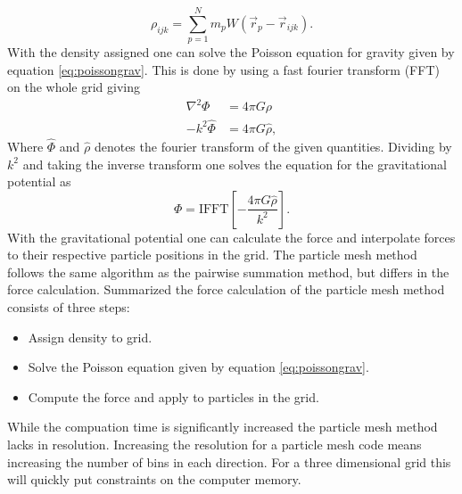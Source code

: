 \begin{equation}
    \rho_{ijk}=\sum_{p=1}^Nm_pW(\vec{r}_p-\vec{r}_{ijk}).
\end{equation}
With the density assigned one can solve the Poisson equation for gravity given
by equation \ref{eq:poissongrav}. This is done by using a fast fourier transform
(FFT) on the whole grid giving
\begin{align}
    \nabla^2\Phi&=4\pi G\rho\\
    -k^2 \hat{\Phi}&=4\pi G \hat{\rho},
\end{align}
Where $\hat{\Phi}$ and $\hat{\rho}$ denotes the fourier transform of the given
quantities. Dividing by $k^2$ and taking the inverse transform one solves the
equation for the gravitational potential as
\begin{equation}
    \Phi = \mathrm{IFFT}[-\frac{4\pi G \hat{\rho}}{k^2}].
\end{equation}
With the gravitational potential one can calculate the force and interpolate
forces to their respective particle positions in the grid. The particle mesh
method follows the same algorithm as the pairwise summation method, but differs
in the force calculation. Summarized the force calculation of the particle mesh
method consists of three steps:
\begin{itemize}
    \item Assign density to grid. \\
    \item Solve the Poisson equation given by equation \ref{eq:poissongrav}.\\
    \item Compute the force and apply to particles in the grid.
\end{itemize}
While the compuation time is significantly increased the
particle mesh method lacks in resolution. Increasing the resolution for a
particle mesh code means increasing the number of bins in each direction. For a
three dimensional grid this will quickly put constraints on the computer memory.
